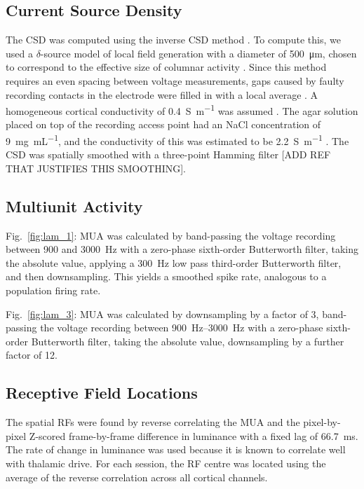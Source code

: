\subsection{Current Source Density}
The \ac{CSD} was computed using the inverse \ac{CSD} method \citep{Pettersen2006}.
To compute this, we used a $\delta$-source model of local field generation with a diameter of \SI{500}{\micro\metre}, chosen to correspond to the effective size of columnar activity \citep{Horton2005,Lund2003}.
Since this method requires an even spacing between voltage measurements, gaps caused by faulty recording contacts in the electrode were filled in with a local average \citep{Wojcik2010}.
A homogeneous cortical conductivity of \SI{0.4}{\siemens\per\metre} was assumed \citep{Logothetis2007}.
The agar solution placed on top of the recording access point had an \ac{NaCl} concentration of \SI{9}{\mg\per\mL}, and the conductivity of this was estimated to be \SI{2.2}{\siemens\per\metre} \citep{Kandadai2012}.
The \ac{CSD} was spatially smoothed with a three-point Hamming filter [ADD REF THAT JUSTIFIES THIS SMOOTHING].

\subsection{Multiunit Activity}
Fig.~\ref{fig:lam_1}: \ac{MUA} was calculated by band-passing the voltage recording between 900 and \SI{3000}{Hz} with a zero-phase sixth-order Butterworth filter, taking the absolute value, applying a \SI{300}{Hz} low pass third-order Butterworth filter, and then downsampling.
This yields a smoothed spike rate, analogous to a population firing rate.

Fig.~\ref{fig:lam_3}: \ac{MUA} was calculated by downsampling by a factor of 3, band-passing the voltage recording between \SIrange{900}{3000}{Hz} with a zero-phase sixth-order Butterworth filter, taking the absolute value, downsampling by a further factor of 12.

\subsection{Receptive Field Locations}
The spatial \acp{RF} were found by reverse correlating the \ac{MUA} and the pixel-by-pixel Z-scored frame-by-frame difference in luminance with a fixed lag of \SI{66.7}{\milli\second}.
The rate of change in luminance was used because it is known to correlate well with thalamic drive.
For each session, the \ac{RF} centre was located using the average of the reverse correlation across all cortical channels.

